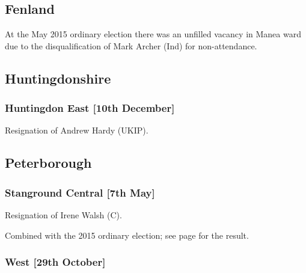 \documentclass[a4paper,openany]{book}
\begin{document}
\begin{resultsiii}
\subsection*{Fenland}

At the May 2015 ordinary election there was an unfilled vacancy in Manea ward due to the disqualification of Mark Archer (Ind) for non-attendance.

\subsection*{Huntingdonshire}

\subsubsection*{Huntingdon East \hspace*{\fill}\nolinebreak[1]%
\enspace\hspace*{\fill}
[10th December]}


Resignation of Andrew Hardy (UKIP).

\subsection*{Peterborough}

\subsubsection*{Stanground Central \hspace*{\fill}\nolinebreak[1]%
\enspace\hspace*{\fill}
[7th May]}


Resignation of Irene Walsh (C).

Combined with the 2015 ordinary election; see page \pageref{StangroundCentralPeterborough} for the result.

\subsubsection*{West \hspace*{\fill}\nolinebreak[1]%
\enspace\hspace*{\fill}
[29th October]}


\end{resultsiii}
\end{document}
